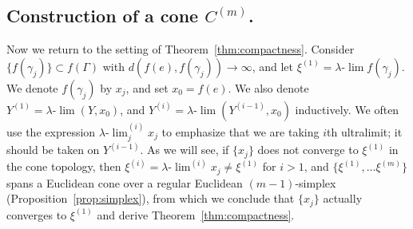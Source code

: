 \documentclass[12pt]{amsart}
\numberwithin{equation}{section}
\theoremstyle{plain}
\theoremstyle{definition}
\theoremstyle{remark}
\newcommand{\uulim}[1][]{\lambda{\text{-}}\!{\lim}^{(#1)}}
\newcommand{\ulim}{\lambda{\text{-}}\!\lim}
\newcommand{\xxi}[1]{\xi^{(#1)}}
\newcommand{\cone}[2][]{C_{#1}^{(#2)}}
\begin{document}
\subsection{Construction of a cone $\cone{m}$.}
\label{sec:construction-conem}

Now we return to the setting of Theorem~\ref{thm:compactness}. 
Consider $\{f(\gamma_j)\} \subset f(\Gamma)$ with 
$d(f(e),f(\gamma_j))\to \infty$, and let $\xxi{1}=\ulim f(\gamma_j)$. 
We denote $f(\gamma_j)$ by $x_j$, and set $x_0=f(e)$. 
We also denote $Y^{(1)}=\ulim (Y,x_0)$, and 
$Y^{(i)}=\ulim (Y^{(i-1)},x_0)$ inductively. 
We often use the expression $\uulim[i]_j x_j$ to emphasize that we are
taking $i$th ultralimit; it should be taken on $Y^{(i-1)}$. 
As we will see, if $\{x_j\}$ does not converge to $\xxi{1}$ in the cone
topology, then $\xxi{i}=\uulim[i]x_j \not=\xxi{1}$ for $i>1$, and 
$\{\xxi{1}, \dots \xxi{m}\}$
spans a Euclidean cone over a regular Euclidean $(m-1)$-simplex 
(Proposition~\ref{prop:simplex}), from which we conclude that $\{x_j\}$
actually converges to $\xxi{1}$ and derive
Theorem~\ref{thm:compactness}. 
\end{document}
